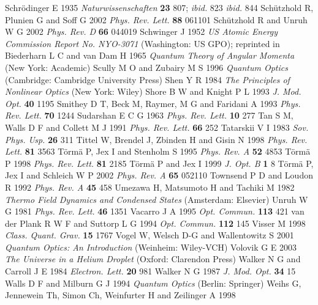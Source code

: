 \documentclass[12pt,amsmath,amssymb]{article}
\numberwithin{equation}{section}
\begin{document}
\begin{thebibliography}{999}
Schr\"odinger E 1935
{\it Naturwissenschaften}
{\bf 23} 807;
{\it ibid.} 823
{\it ibid.} 844
Sch\"utzhold R, Plunien G and Soff G 2002
{\it Phys. Rev. Lett.} {\bf 88} 061101
Sch\"utzhold R and Unruh W G 2002
{\it Phys. Rev. D} {\bf 66} 044019
Schwinger J 1952 {\it US Atomic Energy Commission Report No.
NYO-3071} (Washington: US GPO); reprinted in Biederharn L C and
van Dam H 1965  {\it Quantum Theory of Angular Momenta}
(New York: Academic)
Scully M O and Zubairy M S 1996
{\it Quantum Optics}
(Cambridge: Cambridge University Press)
Shen Y R 1984
{\it The Principles of Nonlinear Optics}
(New York: Wiley)
Shore B W and Knight P L 1993
{\it J. Mod. Opt.} {\bf 40} 1195
Smithey D T, Beck M, Raymer, M G and Faridani A 1993
{\it Phys. Rev. Lett.} {\bf 70} 1244
Sudarshan E C G 1963 {\it Phys. Rev. Lett.} {\bf 10} 277
Tan S M, Walls D F and Collett M J  1991
{\it Phys. Rev. Lett.} {\bf 66} 252
Tatarskii V I 1983
{\it Sov. Phys. Usp.} {\bf 26} 311
Tittel W, Brendel J, Zbinden H and Gisin N 1998
{\it Phys. Rev. Lett.} {\bf 81} 3563
T\"orm\"a P, Jex I and Stenholm S 1995
{\it Phys. Rev. A} {\bf 52} 4853
T\"orm\"a P 1998
{\it Phys. Rev. Lett.} {\bf 81} 2185
T\"orm\"a P and Jex I 1999
{\it J. Opt. B} {\bf 1} 8
T\"orm\"a P, Jex I and Schleich W P 2002
{\it Phys. Rev. A} {\bf 65} 052110
Townsend P D and Loudon R 1992
{\it Phys. Rev. A} {\bf 45} 458
Umezawa H, Matsumoto H and Tachiki M 1982
{\it Thermo Field Dynamics and Condensed States}
(Amsterdam: Elsevier)
Unruh W G 1981
{\it Phys. Rev. Lett.} {\bf 46} 1351
Vacarro J A 1995 {\it Opt. Commun.} {\bf 113} 421
van der Plank R W F and Suttorp L G 1994
{\it Opt. Commun.} {\bf 112} 145
Visser M 1998
{\it Class. Quant. Grav.} {\bf 15} 1767
Vogel W, Welsch D-G and Wallentowitz S 2001
{\it Quantum Optics: An Introduction}
(Weinheim: Wiley-VCH)
Volovik G E 2003
{\it The Universe in a Helium Droplet}
(Oxford: Clarendon Press)
Walker N G and Carroll J E 1984
{\it Electron. Lett.} {\bf 20} 981
Walker N G 1987
{\it J. Mod. Opt.} {\bf 34} 15
Walls D F and Milburn G J 1994
{\it Quantum Optics}
(Berlin: Springer)
Weihs G, Jennewein Th, Simon Ch, Weinfurter H and Zeilinger A 1998

\end{thebibliography}
\end{document}
